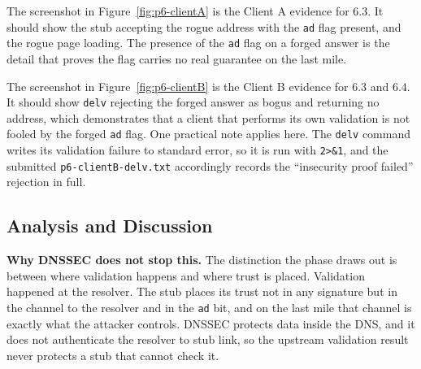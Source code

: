\documentclass[11pt]{article}
\begin{document}

The screenshot in Figure~\ref{fig:p6-clientA} is the Client A evidence for 6.3. It
should show the stub accepting the rogue address with the \texttt{ad} flag present,
and the rogue page loading. The presence of the \texttt{ad} flag on a forged answer
is the detail that proves the flag carries no real guarantee on the last mile.


The screenshot in Figure~\ref{fig:p6-clientB} is the Client B evidence for 6.3 and
6.4. It should show \texttt{delv} rejecting the forged answer as bogus and
returning no address, which demonstrates that a client that performs its own
validation is not fooled by the forged \texttt{ad} flag. One practical note applies
here. The \texttt{delv} command writes its validation failure to standard error, so
it is run with \texttt{2>\&1}, and the submitted \texttt{p6-clientB-delv.txt}
accordingly records the ``insecurity proof failed'' rejection in full.

\subsection{Analysis and Discussion}

\textbf{Why DNSSEC does not stop this.} The distinction the phase draws out is
between where validation happens and where trust is placed. Validation happened at
the resolver. The stub places its trust not in any signature but in the channel to
the resolver and in the \texttt{ad} bit, and on the last mile that channel is
exactly what the attacker controls. DNSSEC protects data inside the DNS, and it does
not authenticate the resolver to stub link, so the upstream validation result never
protects a stub that cannot check it.
\end{document}
